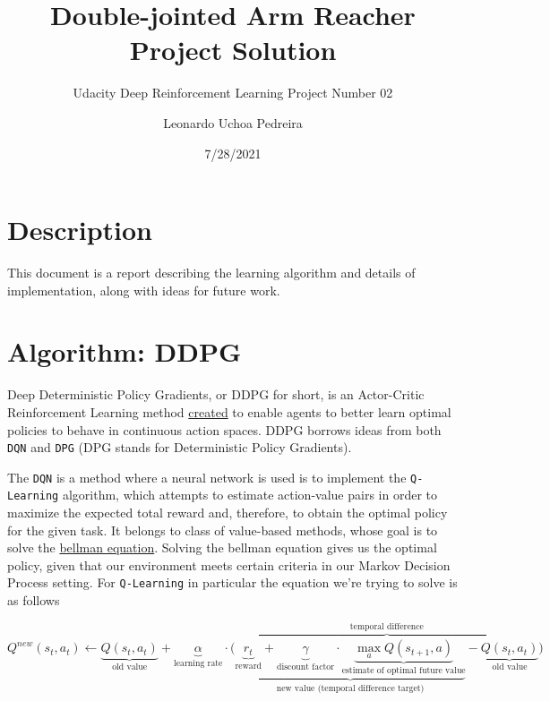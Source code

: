 \documentclass[
]{article}
\title{Double-jointed Arm Reacher Project Solution}
\subtitle{Udacity Deep Reinforcement Learning Project Number 02}
\author{Leonardo Uchoa Pedreira}
\date{7/28/2021}
\begin{document}
\maketitle

{
\setcounter{tocdepth}{2}
\tableofcontents
}
\hypertarget{description}{%
\section{Description}\label{description}}

This document is a report describing the learning algorithm and details
of implementation, along with ideas for future work.

\pagebreak

\hypertarget{algorithm-ddpg}{%
\section{Algorithm: DDPG}\label{algorithm-ddpg}}

Deep Deterministic Policy Gradients, or DDPG for short, is an
Actor-Critic Reinforcement Learning method
\href{https://arxiv.org/pdf/1509.02971.pdf}{created} to enable agents to
better learn optimal policies to behave in continuous action spaces.
DDPG borrows ideas from both \texttt{DQN} and \texttt{DPG} (DPG stands
for Deterministic Policy Gradients).

The \texttt{DQN} is a method where a neural network is used is to
implement the \texttt{Q-Learning} algorithm, which attempts to estimate
action-value pairs in order to maximize the expected total reward and,
therefore, to obtain the optimal policy for the given task. It belongs
to class of value-based methods, whose goal is to solve the
\href{https://en.wikipedia.org/wiki/Bellman_equation}{bellman equation}.
Solving the bellman equation gives us the optimal policy, given that our
environment meets certain criteria in our Markov Decision Process
setting. For \texttt{Q-Learning} in particular the equation we're trying
to solve is as follows

\[
\displaystyle Q^{new}(s_{t},a_{t})\leftarrow \underbrace {Q(s_{t},a_{t})} _{\text{old value}}+\underbrace {\alpha } _{\text{learning rate}}\cdot \overbrace {{\bigg (}\underbrace {\underbrace {r_{t}} _{\text{reward}}+\underbrace {\gamma } _{\text{discount factor}}\cdot \underbrace {\max _{a}Q(s_{t+1},a)} _{\text{estimate of optimal future value}}} _{\text{new value (temporal difference target)}}-\underbrace {Q(s_{t},a_{t})} _{\text{old value}}{\bigg )}} ^{\text{temporal difference}} 
\]
\end{document}
